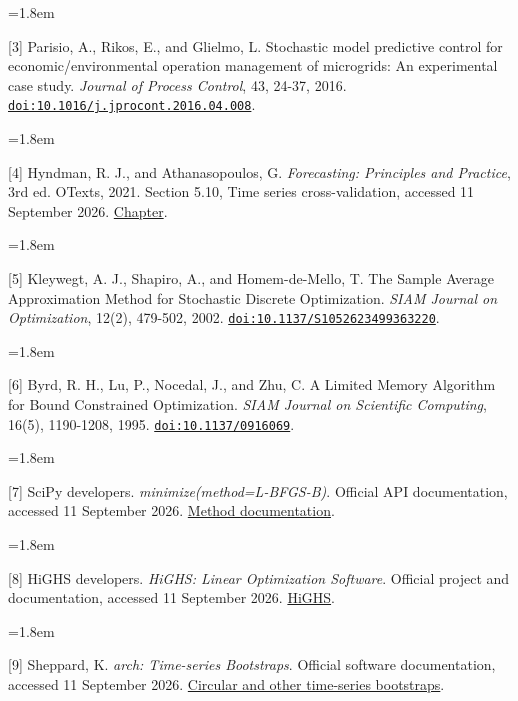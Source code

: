 \hangindent=1.8em

{[}3{]} Parisio, A., Rikos, E., and Glielmo, L. Stochastic model predictive control for economic/environmental operation management of microgrids: An experimental case study. \emph{Journal of Process Control}, 43, 24-37, 2016. \href{https://doi.org/10.1016/j.jprocont.2016.04.008}{\nolinkurl{doi:10.1016/j.jprocont.2016.04.008}}.

\hangindent=1.8em

{[}4{]} Hyndman, R. J., and Athanasopoulos, G. \emph{Forecasting: Principles and Practice}, 3rd ed. OTexts, 2021. Section 5.10, Time series cross-validation, accessed 11 September 2026. \href{https://otexts.com/fpp3/tscv.html}{Chapter}.

\hangindent=1.8em

{[}5{]} Kleywegt, A. J., Shapiro, A., and Homem-de-Mello, T. The Sample Average Approximation Method for Stochastic Discrete Optimization. \emph{SIAM Journal on Optimization}, 12(2), 479-502, 2002. \href{https://doi.org/10.1137/S1052623499363220}{\nolinkurl{doi:10.1137/S1052623499363220}}.

\hangindent=1.8em

{[}6{]} Byrd, R. H., Lu, P., Nocedal, J., and Zhu, C. A Limited Memory Algorithm for Bound Constrained Optimization. \emph{SIAM Journal on Scientific Computing}, 16(5), 1190-1208, 1995. \href{https://doi.org/10.1137/0916069}{\nolinkurl{doi:10.1137/0916069}}.

\hangindent=1.8em

{[}7{]} SciPy developers. \emph{minimize(method=\textquotesingle L-BFGS-B\textquotesingle)}. Official API documentation, accessed 11 September 2026. \href{https://docs.scipy.org/doc/scipy/reference/optimize.minimize-lbfgsb.html}{Method documentation}.

\hangindent=1.8em

{[}8{]} HiGHS developers. \emph{HiGHS: Linear Optimization Software}. Official project and documentation, accessed 11 September 2026. \href{https://highs.dev/}{HiGHS}.

\hangindent=1.8em

{[}9{]} Sheppard, K. \emph{arch: Time-series Bootstraps}. Official software documentation, accessed 11 September 2026. \href{https://bashtage.github.io/arch/bootstrap/timeseries-bootstraps.html}{Circular and other time-series bootstraps}.

\endgroup

